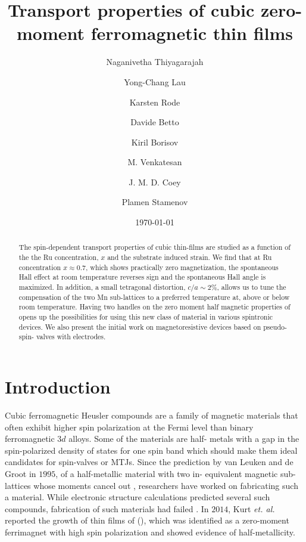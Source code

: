 \documentclass[reprint,aip,apl,floatfix,linenumbers,superscriptaddress]{revtex4-1}
\begin{document}
\title{Transport properties of cubic zero-moment ferromagnetic  thin films}
\author{Naganivetha Thiyagarajah}
\author{Yong-Chang Lau}
\author{Karsten Rode}
\author{Davide Betto}
\author{Kiril Borisov}
\author{M. Venkatesan}
\author{J. M. D. Coey}
\author{Plamen Stamenov}

\date{\today}

\begin{abstract}
The spin-dependent transport properties of cubic  thin-films 
are studied as a function of the the Ru concentration, $x$ and the substrate 
induced strain. We find that at Ru concentration $x\approx\num{0.7}$, which 
shows practically zero magnetization, the spontaneous Hall effect at room 
temperature reverses sign and the spontaneous Hall angle is maximized. In 
addition, a small tetragonal distortion, $c/a\sim\num{2}\%$, allows us to 
tune the compensation of the two Mn sub-lattices to a preferred temperature 
at, above or below room temperature. Having two handles on the zero moment 
half magnetic properties of  opens up the possibilities for 
using this new class of material in various spintronic devices. We also 
present the initial work on magnetoresistive devices based on pseudo-spin-
valves with  electrodes.

\end{abstract}
\maketitle

\section{Introduction}
\label{sec:intro}

Cubic ferromagnetic Heusler compounds are a family of magnetic materials that 
often exhibit higher spin polarization at the Fermi level than binary 
ferromagnetic $3d$ alloys\cite{Graf2013}. Some of the materials are half-
metals with a gap in the spin-polarized density of states for one spin band 
which should make them ideal candidates for spin-valves or MTJs\cite{PhysRevB.
28.1745,Wang2009,Takahashi2011,Tsunegi2008}.  Since the prediction by van 
Leuken and de Groot in $1995$, of a half-metallic material with two in-
equivalent magnetic sub-lattices whose moments cancel out \cite{PhysRevLett.50
.2024}, researchers have worked on fabricating such a material. While 
electronic structure calculations predicted several such compounds\cite{
Wurmehl2006, Hu2012, Galanakis2006}, fabrication of such materials had failed
\cite{Hu2012,PhysRevB.79.100406}. In $2014$, Kurt \textit{et. al.} reported 
the growth of thin films of  (), which was identified 
as a zero-moment ferrimagnet with high spin polarization and showed evidence 
of half-metallicity\cite{KurtPRL2014}. 
\end{document}
